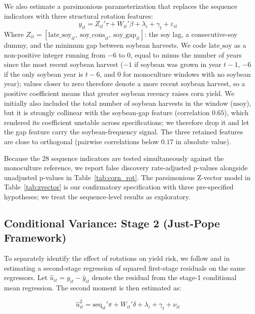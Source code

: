\documentclass[12pt,letterpaper]{article}
\theoremstyle{remark}
\theoremstyle{remark}
\theoremstyle{plain}
\theoremstyle{definition}
\begin{document}
We also estimate a parsimonious parameterization that replaces the sequence indicators with three structural rotation features:
%
\begin{equation}
  y_{it} = Z_{it}'\tau + W_{it}'\beta + \lambda_i + \gamma_t + \varepsilon_{it}
  \label{eq:zvector}
\end{equation}
%
 Where $Z_{it} = [\text{late\_soy}_{it},\ \text{soy\_cons}_{it},\ \text{soy\_gap}_{it}]$: the soy lag, a consecutive-soy dummy, and the minimum gap between soybean harvests. We code $\text{late\_soy}$ as a non-positive integer running from $-6$ to $0$, equal to minus the number of years since the most recent soybean harvest ($-1$ if soybean was grown in year $t-1$, $-6$ if the only soybean year is $t-6$, and $0$ for monoculture windows with no soybean year); values closer to zero therefore denote a more recent soybean harvest, so a positive coefficient means that greater soybean recency raises corn yield. We initially also included the total number of soybean harvests in the window ($\text{nsoy}$), but it is strongly collinear with the soybean-gap feature (correlation $0.65$), which rendered its coefficient unstable across specifications; we therefore drop it and let the gap feature carry the soybean-frequency signal. The three retained features are close to orthogonal (pairwise correlations below $0.17$ in absolute value).

Because the 28 sequence indicators are tested simultaneously against the monoculture reference, we report \cite{Benjamini1995} false discovery rate-adjusted p-values alongside unadjusted p-values in Table~\ref{tab:corn_rot}. The parsimonious Z-vector model in Table~\ref{tab:zvector} is our confirmatory specification with three pre-specified hypotheses; we treat the sequence-level results as exploratory.

\subsection{\label{subsec:stage_2}Conditional Variance: Stage 2 (Just-Pope Framework)}

To separately identify the effect of rotations on yield risk, we follow \cite{Just1979} and \cite{antle1983} in estimating a second-stage regression of squared first-stage residuals on the same regressors. Let $\hat{u}_{it} = y_{it}-\hat{y}_{it}$ denote
the residual from the stage-1 conditional mean regression. The second moment is then estimated as:

\begin{equation}
    \hat{u}_{it}^2 = \text{seq}_{it}'\pi + W_{it}'\delta + \lambda_i + \gamma_t + \nu_{it}\label{eq:stage2}
\end{equation}
\end{document}
